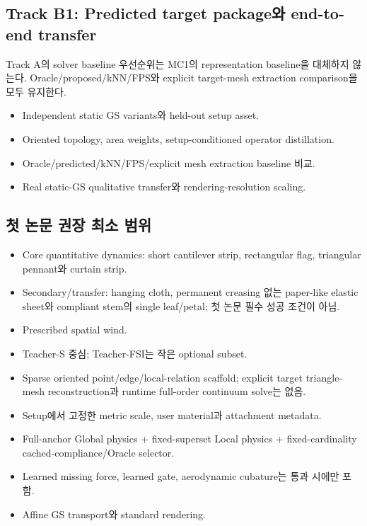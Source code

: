 \documentclass[11pt,a4paper]{article}
\begin{document}
\subsection{Track B1: Predicted target package와 end-to-end transfer}

Track A의 solver baseline 우선순위는 MC1의 representation baseline을 대체하지 않는다.
Oracle/proposed/kNN/FPS와 explicit target-mesh extraction comparison을 모두 유지한다.

\begin{itemize}[leftmargin=1.5em]
  \item Independent static GS variants와 held-out setup asset.
  \item Oriented topology, area weights, setup-conditioned operator distillation.
  \item Oracle/predicted/kNN/FPS/explicit mesh extraction baseline 비교.
  \item Real static-GS qualitative transfer와 rendering-resolution scaling.
\end{itemize}

\subsection{첫 논문 권장 최소 범위}

\begin{itemize}[leftmargin=1.5em]
  \item Core quantitative dynamics: short cantilever strip, rectangular flag,
  triangular pennant와 curtain strip.
  \item Secondary/transfer: hanging cloth, permanent creasing 없는 paper-like elastic sheet와
  compliant stem의 single leaf/petal; 첫 논문 필수 성공 조건이 아님.
  \item Prescribed spatial wind.
  \item Teacher-S 중심; Teacher-FSI는 작은 optional subset.
  \item Sparse oriented point/edge/local-relation scaffold;
  explicit target triangle-mesh reconstruction과 runtime full-order continuum solve는 없음.
  \item Setup에서 고정한 metric scale, user material과 attachment metadata.
  \item Full-anchor Global physics + fixed-superset Local physics + fixed-cardinality cached-compliance/Oracle selector.
  \item Learned missing force, learned gate, aerodynamic cubature는 통과 시에만 포함.
  \item Affine GS transport와 standard rendering.
\end{itemize}
\end{document}
